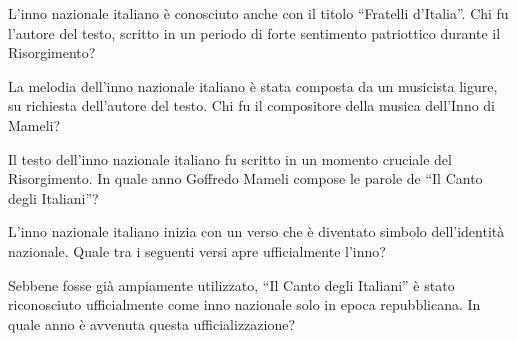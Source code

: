 \startSection
	
	\begin{question}{L'inno nazionale italiano è conosciuto anche con il titolo \enquote{Fratelli d'Italia}. Chi fu l'autore del testo, scritto in un periodo di forte sentimento patriottico durante il Risorgimento?}
	\end{question}

	
	\begin{question}{La melodia dell'inno nazionale italiano è stata composta da un musicista ligure, su richiesta dell'autore del testo. Chi fu il compositore della musica dell'Inno di Mameli?}
	\end{question}

	
	\begin{question}{Il testo dell'inno nazionale italiano fu scritto in un momento cruciale del Risorgimento. In quale anno Goffredo Mameli compose le parole de \enquote{Il Canto degli Italiani}?}
	\end{question}

	
	\begin{question}{L'inno nazionale italiano inizia con un verso che è diventato simbolo dell'identità nazionale. Quale tra i seguenti versi apre ufficialmente l'inno?}
	\end{question}

	
	\begin{question}{Sebbene fosse già ampiamente utilizzato, \enquote{Il Canto degli Italiani} è stato riconosciuto ufficialmente come inno nazionale solo in epoca repubblicana. In quale anno è avvenuta questa ufficializzazione?}
	\end{question}
\renderSection
